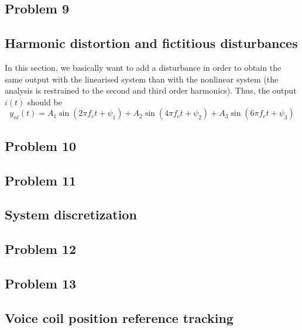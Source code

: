 \documentclass[11pt,a4paper,fleqn, onesside]{report}
\begin{document}
\subsection*{Problem 9}


\subsection{Harmonic distortion and fictitious disturbances}
In this section, we basically want to add a disturbance in order to obtain the same output with the linearised system than with the nonlinear system (the analysis is restrained to the second and third order harmonics). Thus, the output $i(t)$ should be
\begin{equation}
\label{eq:output}
y_{nl}(t)=A_1\sin(2\pi f_ct+\psi_1)+A_2\sin(4\pi f_ct+\psi_2)+A_3\sin(6\pi f_ct+\psi_3)
\end{equation}

\subsection*{Problem 10}


\subsection*{Problem 11}


\subsection{System discretization}
\subsection*{Problem 12}


\subsection*{Problem 13}


\subsection{Voice coil position reference tracking}

\end{document}
